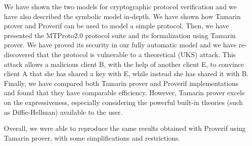 We have shown the two models for cryptographic protocol verification and we have also described the symbolic model in-depth. We have shown how Tamarin prover and Proverif can be used to model a simple protocol. Then, we have presented the MTProto2.0 protocol suite and its formalization using Tamarin prover. We have proved its security in our fully automatic model and we have re-discovered that the protocol is vulnerable to a theoretical \uks{} (UKS) attack. This attack allows a malicious client B, with the help of another client E, to convince client A that she has shared a key with E, while instead she has shared it with B. Finally, we have compared both Tamarin prover and Proverif implementations and found that they have comparable efficiency. However, Tamarin prover excels on the expressiveness, especially considering the powerful built-in theories (such as Diffie-Hellman) available to the user.

Overall, we were able to reproduce the same results obtained with Proverif using Tamarin prover, with some simplifications and restrictions.